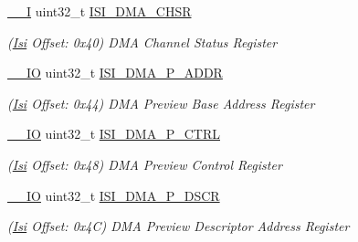 \begin{DoxyCompactItemize}
\mbox{\label{structIsi_a78cfb57461da5e298d75901b1d75c056}} 
\mbox{\hyperlink{core__cm7_8h_af63697ed9952cc71e1225efe205f6cd3}{\+\_\+\+\_\+I}} uint32\+\_\+t \mbox{\hyperlink{structIsi_a78cfb57461da5e298d75901b1d75c056}{I\+S\+I\+\_\+\+D\+M\+A\+\_\+\+C\+H\+SR}}
\begin{DoxyCompactList}\small\item\em (\mbox{\hyperlink{structIsi}{Isi}} Offset\+: 0x40) D\+MA Channel Status Register \end{DoxyCompactList}\item 
\mbox{\label{structIsi_a0cdf3dd2d454bf0ee63d24753c67e947}} 
\mbox{\hyperlink{core__cm7_8h_aec43007d9998a0a0e01faede4133d6be}{\+\_\+\+\_\+\+IO}} uint32\+\_\+t \mbox{\hyperlink{structIsi_a0cdf3dd2d454bf0ee63d24753c67e947}{I\+S\+I\+\_\+\+D\+M\+A\+\_\+\+P\+\_\+\+A\+D\+DR}}
\begin{DoxyCompactList}\small\item\em (\mbox{\hyperlink{structIsi}{Isi}} Offset\+: 0x44) D\+MA Preview Base Address Register \end{DoxyCompactList}\item 
\mbox{\label{structIsi_a87d3c63b1fbbc53c603cefabe4a46001}} 
\mbox{\hyperlink{core__cm7_8h_aec43007d9998a0a0e01faede4133d6be}{\+\_\+\+\_\+\+IO}} uint32\+\_\+t \mbox{\hyperlink{structIsi_a87d3c63b1fbbc53c603cefabe4a46001}{I\+S\+I\+\_\+\+D\+M\+A\+\_\+\+P\+\_\+\+C\+T\+RL}}
\begin{DoxyCompactList}\small\item\em (\mbox{\hyperlink{structIsi}{Isi}} Offset\+: 0x48) D\+MA Preview Control Register \end{DoxyCompactList}\item 
\mbox{\label{structIsi_a657ea22f81e597c0e7d08fdd442a26a2}} 
\mbox{\hyperlink{core__cm7_8h_aec43007d9998a0a0e01faede4133d6be}{\+\_\+\+\_\+\+IO}} uint32\+\_\+t \mbox{\hyperlink{structIsi_a657ea22f81e597c0e7d08fdd442a26a2}{I\+S\+I\+\_\+\+D\+M\+A\+\_\+\+P\+\_\+\+D\+S\+CR}}
\begin{DoxyCompactList}\small\item\em (\mbox{\hyperlink{structIsi}{Isi}} Offset\+: 0x4C) D\+MA Preview Descriptor Address Register \end{DoxyCompactList}\item 
\mbox{\label{structIsi_a0504242da753226649e0066daa9a2b50}} 

\end{DoxyCompactItemize}
